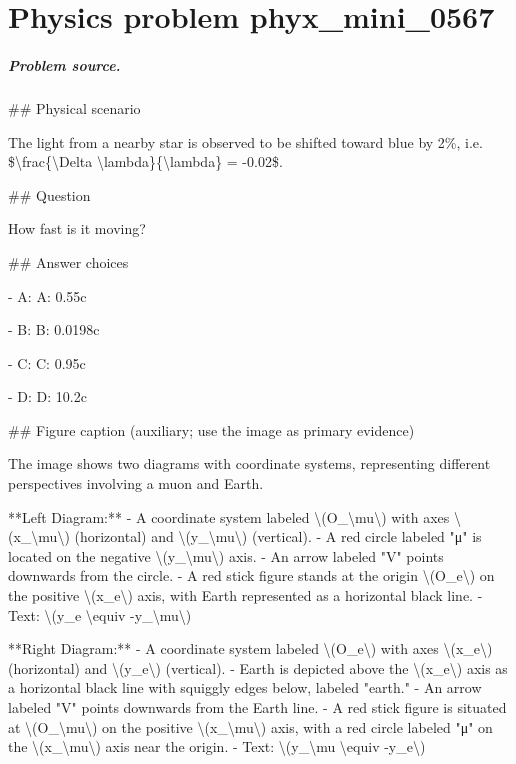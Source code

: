
\chapter{Physics problem phyx\_mini\_0567}
\label{ch:PhyXMiniProblems_problem_phyx_mini_0567}

\paragraph{Problem source.}
\#\# Physical scenario

The light from a nearby star is observed to be shifted toward blue by 2\%, i.e. \$\textbackslash{}frac\{\textbackslash{}Delta \textbackslash{}lambda\}\{\textbackslash{}lambda\} = -0.02\$.

\#\# Question

How fast is it moving?

\#\# Answer choices

- A: A: 0.55c

- B: B: 0.0198c

- C: C: 0.95c

- D: D: 10.2c

\#\# Figure caption (auxiliary; use the image as primary evidence)

The image shows two diagrams with coordinate systems, representing different perspectives involving a muon and Earth.

**Left Diagram:**
- A coordinate system labeled \textbackslash{}(O\_\textbackslash{}mu\textbackslash{}) with axes \textbackslash{}(x\_\textbackslash{}mu\textbackslash{}) (horizontal) and \textbackslash{}(y\_\textbackslash{}mu\textbackslash{}) (vertical). 
- A red circle labeled "μ" is located on the negative \textbackslash{}(y\_\textbackslash{}mu\textbackslash{}) axis.
- An arrow labeled "V" points downwards from the circle.
- A red stick figure stands at the origin \textbackslash{}(O\_e\textbackslash{}) on the positive \textbackslash{}(x\_e\textbackslash{}) axis, with Earth represented as a horizontal black line.
- Text: \textbackslash{}(y\_e \textbackslash{}equiv -y\_\textbackslash{}mu\textbackslash{})

**Right Diagram:**
- A coordinate system labeled \textbackslash{}(O\_e\textbackslash{}) with axes \textbackslash{}(x\_e\textbackslash{}) (horizontal) and \textbackslash{}(y\_e\textbackslash{}) (vertical).
- Earth is depicted above the \textbackslash{}(x\_e\textbackslash{}) axis as a horizontal black line with squiggly edges below, labeled "earth."
- An arrow labeled "V" points downwards from the Earth line.
- A red stick figure is situated at \textbackslash{}(O\_\textbackslash{}mu\textbackslash{}) on the positive \textbackslash{}(x\_\textbackslash{}mu\textbackslash{}) axis, with a red circle labeled "μ" on the \textbackslash{}(x\_\textbackslash{}mu\textbackslash{}) axis near the origin.
- Text: \textbackslash{}(y\_\textbackslash{}mu \textbackslash{}equiv -y\_e\textbackslash{})


